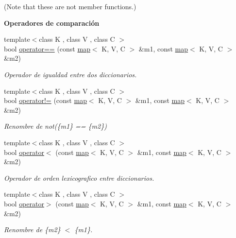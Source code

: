 (\-Note that these are not member functions.) \begin{Indent}{\bf \-Operadores de comparación}\par
\begin{DoxyCompactItemize}
\item 
{\footnotesize template$<$class K , class V , class C $>$ }\\bool \hyperlink{classaed2_1_1map_abfc51b39670220e79037ac067006e933}{operator==} (const \hyperlink{classaed2_1_1map}{map}$<$ \-K, \-V, \-C $>$ \&m1, const \hyperlink{classaed2_1_1map}{map}$<$ \-K, \-V, \-C $>$ \&m2)
\begin{DoxyCompactList}\small\item\em \-Operador de igualdad entre dos diccionarios. \end{DoxyCompactList}\item 
{\footnotesize template$<$class K , class V , class C $>$ }\\bool \hyperlink{classaed2_1_1map_abce0fa35c5b25fd67111c2e704616f09}{operator!=} (const \hyperlink{classaed2_1_1map}{map}$<$ \-K, \-V, \-C $>$ \&m1, const \hyperlink{classaed2_1_1map}{map}$<$ \-K, \-V, \-C $>$ \&m2)
\begin{DoxyCompactList}\small\item\em \-Renombre de not(\{m1\} == \{m2\}) \end{DoxyCompactList}\item 
{\footnotesize template$<$class K , class V , class C $>$ }\\bool \hyperlink{classaed2_1_1map_a8ff07f6a24c290ea7e8f63ec7ab24f8d}{operator$<$} (const \hyperlink{classaed2_1_1map}{map}$<$ \-K, \-V, \-C $>$ \&m1, const \hyperlink{classaed2_1_1map}{map}$<$ \-K, \-V, \-C $>$ \&m2)
\begin{DoxyCompactList}\small\item\em \-Operador de orden lexicografico entre diccionarios. \end{DoxyCompactList}\item 
{\footnotesize template$<$class K , class V , class C $>$ }\\bool \hyperlink{classaed2_1_1map_a2000cd874b72034ce7fe730c811b6c63}{operator$>$} (const \hyperlink{classaed2_1_1map}{map}$<$ \-K, \-V, \-C $>$ \&m1, const \hyperlink{classaed2_1_1map}{map}$<$ \-K, \-V, \-C $>$ \&m2)
\begin{DoxyCompactList}\small\item\em \-Renombre de \{m2\} $<$ \{m1\}. \end{DoxyCompactList}\item 

\end{DoxyCompactItemize}
\end{Indent}
